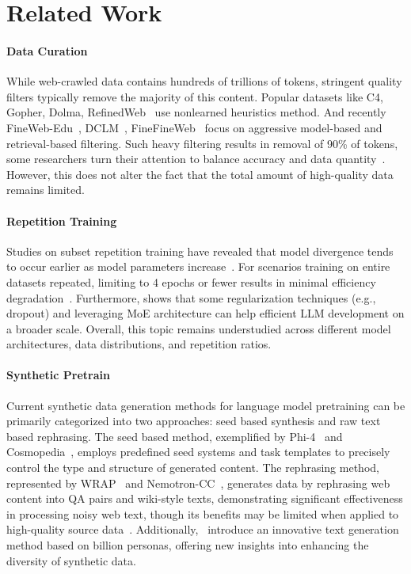 \section{Related Work}
\paragraph{Data Curation}
While web-crawled data contains hundreds of trillions of tokens, stringent quality filters typically remove the majority of this content.
Popular datasets like C4, Gopher, Dolma, RefinedWeb~\citep{raffel2020exploring,rae2021gopher,penedo2023refinedweb,soldaini2024dolma} use nonlearned heuristics method.
And recently FineWeb-Edu~\citep{penedo2024finewebdatasets}, DCLM~\citep{li2024datacomplm}, FineFineWeb~\citep{zhang2024finefineweb} focus on aggressive model-based and retrieval-based filtering. 
Such heavy filtering results in removal of 90\% of tokens, some researchers turn their attention to balance accuracy and data quantity~\citep{su2024nemotron}.
However, this does not alter the fact that the total amount of high-quality data remains limited.

\paragraph{Repetition Training}
Studies on subset repetition training have revealed that model divergence tends to occur earlier as model parameters increase~\citep{hernandez2022scaling}.
For scenarios training on entire datasets repeated, limiting to 4 epochs or fewer results in minimal efficiency degradation~\citep{muennighoff2023scaling,taylor2022galactica}.
Furthermore, \citep{xue2024repeat} shows that some regularization techniques (e.g., dropout) and leveraging MoE architecture can help efficient LLM development on a broader scale.
Overall, this topic remains understudied across different model architectures, data distributions, and repetition ratios.

\paragraph{Synthetic Pretrain}
Current synthetic data generation methods for language model pretraining can be primarily categorized into two approaches: seed based synthesis and raw text based rephrasing. 
The seed based method, exemplified by Phi-4~\citep{abdin2024phi} and Cosmopedia~\citep{benallal2024smollmcorpus}, employs predefined seed systems and task templates to precisely control the type and structure of generated content. 
The rephrasing method, represented by WRAP~\citep{maini2024rephrasing} and Nemotron-CC~\citep{su2024nemotron}, generates data by rephrasing web content into QA pairs and wiki-style texts, 
demonstrating significant effectiveness in processing noisy web text, though its benefits may be limited when applied to high-quality source data~\citep{pieler2024rephrasing}.
Additionally,~\citet{ge2024scalingpersonas} introduce an innovative text generation method based on billion personas, offering new insights into enhancing the diversity of synthetic data.

